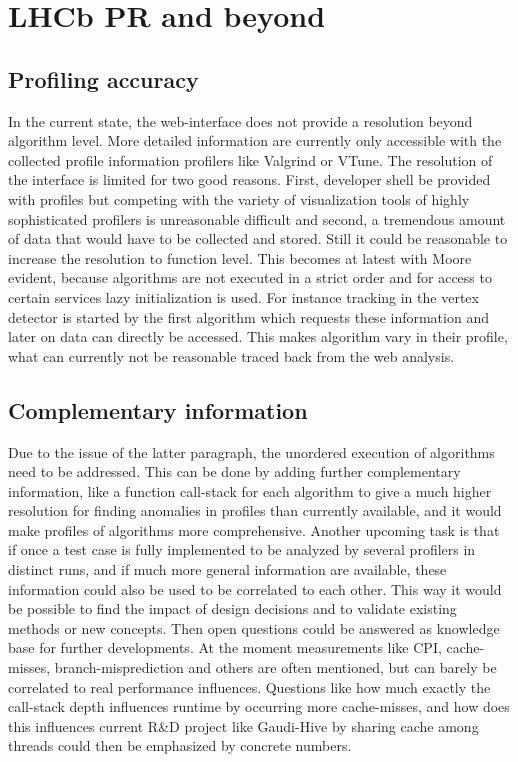 \documentclass[a4paper]{jpconf}
\begin{document}
\section{LHCb PR and beyond}
\label{sec:lhcbpr_and_beyond}

\subsection{Profiling accuracy}
\label{sec:profiling accuracy}

In the current state, the web-interface does not provide a resolution beyond algorithm level. More detailed information are currently only accessible with the collected profile information profilers like Valgrind or VTune. The resolution of the interface is limited for two good reasons. First, developer shell be provided with profiles but competing with the variety of visualization tools of highly sophisticated profilers is unreasonable difficult and second, a tremendous amount of data that would have to be collected and stored. Still it could be reasonable to increase the resolution to function level. This becomes at latest with Moore evident, because algorithms are not executed in a strict order and for access to certain services lazy initialization is used. For instance tracking in the vertex detector is started by the first algorithm which requests these information and later on data can directly be accessed. This makes algorithm vary in their profile, what can currently not be reasonable traced back from the web analysis.

\subsection{Complementary information}
\label{sec:complementary_information}

Due to the issue of the latter paragraph, the unordered execution of algorithms need to be addressed. This can be done by adding further complementary information, like a function call-stack for each algorithm to give a much higher resolution for finding anomalies in profiles than currently available, and it would make profiles of algorithms more comprehensive.
\newline
Another upcoming task is that if once a test case is fully implemented to be analyzed by several profilers in distinct runs, and if much more general information are available, these information could also be used to be correlated to each other. This way it would be possible to find the impact of design decisions and to validate existing methods or new concepts. Then open questions could be answered as knowledge base for further developments.
\newline
At the moment measurements like CPI, cache-misses, branch-misprediction and others are often mentioned, but can barely be correlated to real performance influences. Questions like how much exactly the call-stack depth influences runtime by occurring more cache-misses, and how does this influences current R\&D project like Gaudi-Hive by sharing cache among threads could then be emphasized by concrete numbers.
\end{document}
